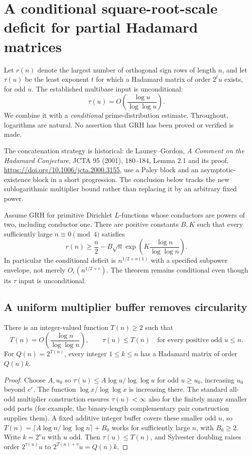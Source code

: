 \section{A conditional square-root-scale deficit for partial Hadamard matrices}
\label{sec:conditional-half-frame}

Let $r(n)$ denote the largest number of orthogonal sign rows of length
$n$, and let $\tau(u)$ be the least exponent $t$ for which a Hadamard
matrix of order $2^tu$ exists, for odd $u$. The established multibase
input is unconditional:
\[
 \tau(u)=O\!\left(\frac{\log u}{\log\log u}\right).
\]
We combine it with a \emph{conditional} prime-distribution estimate.
Throughout, logarithms are natural. No assertion that GRH has been
proved or verified is made.

The concatenation strategy is historical: de Launey--Gordon,
\emph{A Comment on the Hadamard Conjecture}, JCTA 95 (2001),
180--184, Lemma 2.1 and its proof,
\url{https://doi.org/10.1006/jcta.2000.3155}, use a Paley block and
an asymptotic-existence block in a short progression. The conclusion
below tracks the new sublogarithmic multiplier bound rather than
replacing it by an arbitrary fixed power.

\begin{theorem}
Assume GRH for primitive Dirichlet $L$-functions whose conductors are
powers of two, including conductor one. There are positive constants
$B,K$ such that every sufficiently large $n\equiv0\pmod4$ satisfies
\[
 \boxed{r(n)\ge\frac n2-
 B\sqrt n\exp\!\left(K\frac{\log n}{\log\log n}\right).}
\]
In particular the conditional deficit is $n^{1/2+o(1)}$ with a
specified subpower envelope, not merely $O_\epsilon(n^{1/2+\epsilon})$.
The theorem remains conditional even though its $\tau$ input is
unconditional.
\end{theorem}

\subsection{A uniform multiplier buffer removes circularity}
\begin{lemma}
There is an integer-valued function $T(n)\ge2$ such that
\[
 T(n)=O\!\left(\frac{\log n}{\log\log n}\right),
 \qquad \tau(u)\le T(n)\quad
 \text{for every positive odd }u\le n.
\]
For $Q(n)=2^{T(n)}$, every integer $1\le k\le n$ has a Hadamard
matrix of order $Q(n)k$.
\end{lemma}
\begin{proof}
Choose $A,u_0$ so $\tau(u)\le A\log u/\log\log u$ for odd
$u\ge u_0$, increasing $u_0$ beyond $e^e$. The function
$\log x/\log\log x$ is increasing there. The standard all-odd
multiplier construction ensures $\tau(u)<\infty$ also for the finitely
many smaller odd parts (for example, the binary-length complementary
pair construction supplies them). A fixed additive integer buffer
covers these smaller odd $u$, so
$T(n)=\lceil A\log n/\log\log n\rceil+B_0$ works for sufficiently
large $n$, with $B_0\ge2$. Write $k=2^vu$ with $u$ odd. Then
$\tau(u)\le T(n)$, and Sylvester doubling raises order
$2^{\tau(u)}u$ to $2^{T(n)+v}u=Q(n)k$.
\end{proof}

